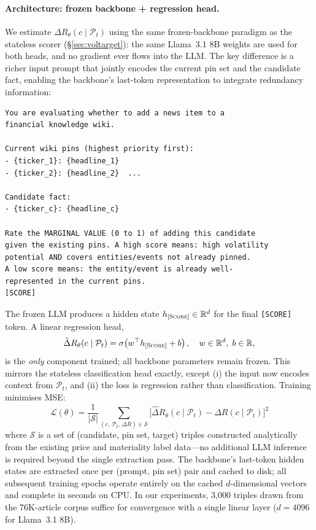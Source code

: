 \documentclass{article}
\newcommand{\pt}{\mathcal{P}_t}
\begin{document}
\paragraph{Architecture: frozen backbone + regression head.}
We estimate $\hat{\Delta}R_\theta(c \mid \pt)$ using the same frozen-backbone paradigm as the stateless scorer (\S\ref{sec:voltarget}): the same Llama~3.1 8B weights are used for both heads, and no gradient ever flows into the LLM.
The key difference is a richer input prompt that jointly encodes the current pin set and the candidate fact, enabling the backbone's last-token representation to integrate redundancy information:

\begin{lstlisting}
You are evaluating whether to add a news item to a
financial knowledge wiki.

Current wiki pins (highest priority first):
- {ticker_1}: {headline_1}
- {ticker_2}: {headline_2}  ...

Candidate fact:
- {ticker_c}: {headline_c}

Rate the MARGINAL VALUE (0 to 1) of adding this candidate
given the existing pins. A high score means: high volatility
potential AND covers entities/events not already pinned.
A low score means: the entity/event is already well-
represented in the current pins.
[SCORE]
\end{lstlisting}

The frozen LLM produces a hidden state $h_{[\textsc{Score}]} \in \mathbb{R}^{d}$ for the final \texttt{[SCORE]} token.
A linear regression head,
\begin{equation}
  \hat{\Delta}R_\theta(c \mid \pt) = \sigma\!\left(w^\top h_{[\textsc{Score}]} + b\right), \quad w \in \mathbb{R}^d,\; b \in \mathbb{R},
  \label{eq:head}
\end{equation}
is the \emph{only} component trained; all backbone parameters remain frozen.
This mirrors the stateless classification head exactly, except (i) the input now encodes context from $\pt$, and (ii) the loss is regression rather than classification.
Training minimises MSE:
\begin{equation}
  \mathcal{L}(\theta) = \frac{1}{|\mathcal{S}|} \sum_{(c,\,\pt,\,\Delta R) \in \mathcal{S}}
  \bigl[\hat{\Delta}R_\theta(c \mid \pt) - \Delta R(c \mid \pt)\bigr]^2
  \label{eq:mse_loss}
\end{equation}
where $\mathcal{S}$ is a set of (candidate, pin set, target) triples constructed analytically from the existing price and materiality label data---no additional LLM inference is required beyond the single extraction pass.
The backbone's last-token hidden states are extracted once per (prompt, pin set) pair and cached to disk; all subsequent training epochs operate entirely on the cached $d$-dimensional vectors and complete in seconds on CPU.
In our experiments, 3{,}000 triples drawn from the 76K-article corpus suffice for convergence with a single linear layer ($d = 4096$ for Llama~3.1 8B).
\end{document}
